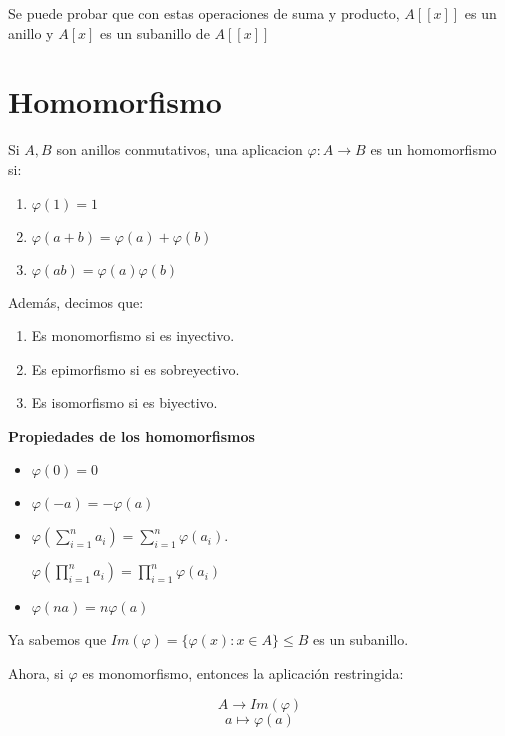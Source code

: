 \documentclass[11pt]{article}
\begin{document}
Se puede probar que con estas operaciones de suma y producto, $A[[x]]$ es un anillo y $A[x]$ es un subanillo de $A[[x]]$  

\section{Homomorfismo}

Si $A,B$ son anillos conmutativos, una aplicacion $\varphi: A \to B$ es un homomorfismo si:

\begin{enumerate}
	\item $\varphi(1) = 1$
	\item $\varphi(a+b) = \varphi(a) + \varphi(b)$
	\item $\varphi(ab) = \varphi(a)  \varphi(b)$
	
\end{enumerate}

Además, decimos que:

\begin{enumerate}
	\item Es monomorfismo si es inyectivo.
	\item Es epimorfismo si es sobreyectivo.
	\item Es isomorfismo si es biyectivo.
\end{enumerate}

\textbf{Propiedades de los homomorfismos}

\begin{itemize}

\item $\varphi(0) = 0$

\item $\varphi(-a) = -\varphi(a) $

\item $\varphi(\sum_{i = 1}^n a_i) = \sum_{i = 1}^n\varphi(a_i)$. 

$\varphi(\prod_{i = 1}^n a_i) = \prod_{i = 1}^n\varphi(a_i)$

\item $\varphi(na) = n\varphi(a)$

	
\end{itemize}


Ya sabemos que $Im(\varphi) = \{ \varphi(x): x \in A\} \leq B$ es un subanillo.

Ahora, si $\varphi$ es monomorfismo, entonces la aplicación restringida:

\[
A \to Im(\varphi)\]
\[
a \mapsto \varphi(a)
\]
\end{document}
